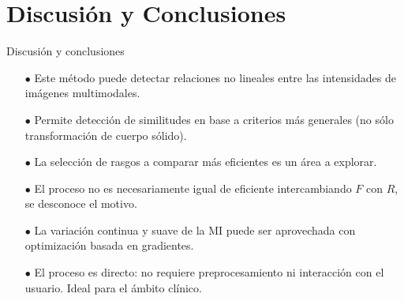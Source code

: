 \documentclass[14pt,xcolor={rgb}]{beamer}
\begin{document}
\section{Discusi\'on y Conclusiones}

\begin{frame}{Discusi\'on y conclusiones}
\footnotesize
\begin{itemize}
	\item[$\bullet$] Este m\'etodo puede detectar relaciones no lineales entre las intensidades de im\'agenes multimodales.
	\item[$\bullet$] Permite detecci\'on de similitudes en base a criterios m\'as generales (no s\'olo transformaci\'on de cuerpo s\'olido).
	\item[$\bullet$] La selecci\'on de rasgos a comparar m\'as eficientes es un \'area a explorar.
	\item[$\bullet$] El proceso no es necesariamente igual de eficiente intercambiando $F$ con $R$, se desconoce el motivo.
	\item[$\bullet$] La variaci\'on continua y suave de la MI puede ser aprovechada con optimizaci\'on basada en gradientes.
	\item[$\bullet$] El proceso es directo: no requiere preprocesamiento ni interacci\'on con el usuario. Ideal para el \'ambito cl\'inico.
\end{itemize}
\end{frame}
\end{document}
